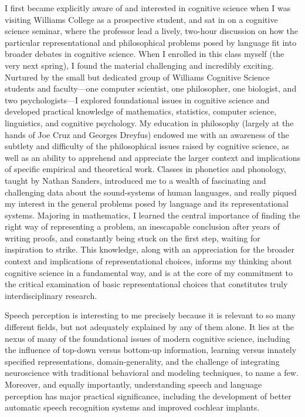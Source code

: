 \documentclass[12pt]{article}
\begin{document}
I first became explicitly aware of and interested in cognitive science when I was visiting Williams College as a prospective student, and sat in on a cognitive science seminar, where the professor lead a lively, two-hour discussion on how the particular representational and philosophical problems posed by language fit into broader debates in cognitive science.  When I enrolled in this class myself (the very next spring), I found the material challenging and incredibly exciting.  Nurtured by the small but dedicated group of Williams Cognitive Science students and faculty---one computer scientist, one philosopher, one biologist, and two psychologists---I explored foundational issues in cognitive science and developed practical knowledge of mathematics, statistics, computer science, linguistics, and cognitive psychology.  My education in philosophy (largely at the hands of Joe Cruz and Georges Dreyfus) endowed me with an awareness of the subtlety and difficulty of the philosophical issues raised by cognitive science, as well as an ability to apprehend and appreciate the larger context and implications of specific empirical and theoretical work.  Classes in phonetics and phonology, taught by Nathan Sanders, introduced me to a wealth of fascinating and challenging data about the sound-systems of human languages, and really piqued my interest in the general problems posed by language and its representational systems.  Majoring in mathematics, I learned the central importance of finding the right way of representing a problem, an inescapable conclusion after years of writing proofs, and constantly being stuck on the first step, waiting for inspiration to strike.  This knowledge, along with an appreciation for the broader context and implications of representational choices, informs my thinking about cognitive science in a fundamental way, and is at the core of my commitment to the critical examination of basic representational choices that constitutes truly interdisciplinary research. 

Speech perception is interesting to me precisely because it is relevant to so many different fields, but not adequately explained by any of them alone.  It lies at the nexus of many of the foundational issues of modern cognitive science, including the influence of top-down versus bottom-up information, learning versus innately specified representations, domain-generality, and the challenge of integrating neuroscience with traditional behavioral and modeling techniques, to name a few.  Moreover, and equally importantly, understanding speech and language perception has major practical significance, including the development of better automatic speech recognition systems and improved cochlear implants.
\end{document}
